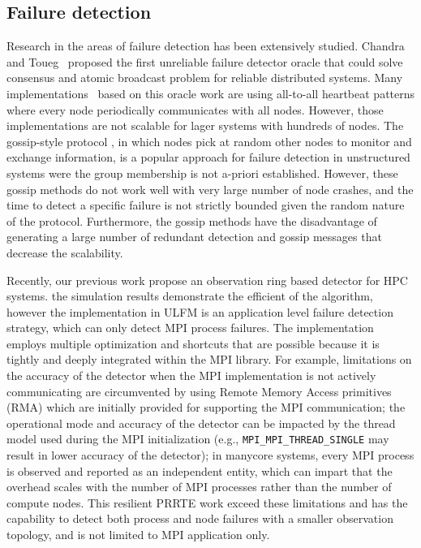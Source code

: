 \documentclass[sigconf]{acmart}
\newcommand{\mpifunc}[1]{\lstinline"MPI_#1"\xspace}
\newcommand{\prrte}[0]{\textsc{PRRTE}\xspace}
\newcommand{\ulfm}[0]{\textsc{ULFM}\xspace}
\newcommand{\mpi}[0]{\textsc{MPI}\xspace}
\begin{document}
\subsection{Failure detection}
Research in the areas of failure detection has been extensively studied. Chandra and Toueg~\cite{Chandra96} proposed the first unreliable failure detector oracle that could solve consensus and atomic broadcast problem for reliable distributed systems. Many implementations~\cite{Wei02, Larrea00, Kawazoe97} based on this oracle work are using all-to-all heartbeat patterns where every node periodically communicates with all nodes. However, those implementations are not scalable for lager systems with hundreds of nodes. The gossip-style protocol \cite{van98, Ranganathan01, Gupta01, Abhinandan02}, in which nodes pick at random other nodes to monitor and exchange information, is a popular approach for failure detection in unstructured systems were the group membership 
is not a-priori established. However, these gossip methods do not work well with very large number of node crashes, and the time to detect a specific failure is not strictly bounded given the 
random nature of the protocol. Furthermore, the gossip methods have the disadvantage of 
generating a large number of redundant detection and gossip messages that decrease the scalability.

Recently, our previous work \cite{George16} propose an observation ring based detector for HPC systems. 
the simulation results demonstrate the efficient of the algorithm, however the implementation in \ulfm is an application level failure detection strategy, which can only detect \mpi process failures. The 
implementation employs multiple optimization and shortcuts that are possible because it is 
tightly and deeply integrated within the \mpi library. For example, limitations on the 
accuracy of the detector when the \mpi implementation is not actively communicating 
are circumvented by using Remote Memory Access primitives (RMA) which are
initially provided for supporting the \mpi communication; the operational 
mode and accuracy of the detector can be impacted by the thread model used 
during the \mpi initialization (e.g., \mpifunc{MPI_THREAD_SINGLE} may result in 
lower accuracy of the detector); in manycore systems, every \mpi process 
is observed and reported as an independent entity, which can impart that the 
overhead scales with the number of \mpi processes rather than the number of 
compute nodes. This resilient \prrte work 
exceed these limitations and has the capability to detect both process and 
node failures with a smaller observation topology, and is not limited to
MPI application only. 
\end{document}
